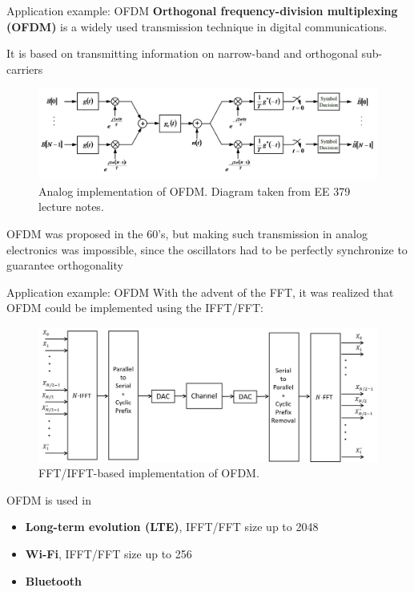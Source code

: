\documentclass[10pt]{beamer}
\begin{document}
%
\begin{frame}{Application example: OFDM}
\textbf{Orthogonal frequency-division multiplexing (OFDM)} is a widely used transmission technique in digital communications.

It is based on transmitting information on narrow-band and orthogonal sub-carriers

\begin{figure}
	\centering
	\includegraphics[scale=0.3]{figs/analog_ofdm.png}\\
	{\color{gray} \small Analog implementation of OFDM. Diagram taken from EE 379 lecture notes.}
\end{figure}

OFDM was proposed in the 60's, but making such transmission in analog electronics was impossible, since the oscillators had to be perfectly synchronize to guarantee orthogonality
\end{frame}


%
\begin{frame}{Application example: OFDM}
With the advent of the FFT, it was realized that OFDM could be implemented using the IFFT/FFT:

\begin{figure}
	\centering
	\includegraphics[scale=0.4]{figs/ofdm_diagram_fft.png}\\
	{\color{gray} \small FFT/IFFT-based implementation of OFDM.}
\end{figure}


OFDM is used in
\begin{itemize}
	\item \textbf{Long-term evolution (LTE)}, IFFT/FFT size up to 2048
	\item \textbf{Wi-Fi}, IFFT/FFT size up to 256
	\item \textbf{Bluetooth}
\end{itemize} 
\end{frame}
\end{document}
